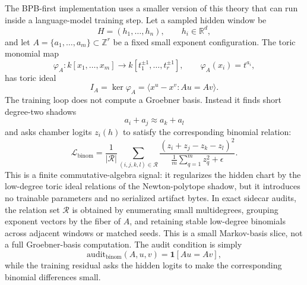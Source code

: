 \documentclass[11pt]{article}
\theoremstyle{definition}
\theoremstyle{plain}
\theoremstyle{remark}
\numberwithin{equation}{section}
\newcommand{\R}{\mathbb{R}}
\newcommand{\Z}{\mathbb{Z}}
\begin{document}
The BPB-first implementation uses a smaller version of this theory that can run inside a language-model training step.  Let a sampled hidden window be
\begin{equation}
  H=(h_1,\ldots,h_n),\qquad h_i\in\R^d,
\end{equation}
and let $A=\{a_1,\ldots,a_m\}\subset \Z^r$ be a fixed small exponent configuration.  The toric monomial map
\begin{equation}
  \varphi_A:k[x_1,\ldots,x_m]\to k[t_1^{\pm1},\ldots,t_r^{\pm1}],
  \qquad \varphi_A(x_i)=t^{a_i},
\end{equation}
has toric ideal
\begin{equation}
  I_A=\ker\varphi_A=\langle x^u-x^v:Au=Av\rangle.
\end{equation}
The training loop does not compute a Groebner basis.  Instead it finds short degree-two shadows
\begin{equation}
  a_i+a_j\approx a_k+a_l
\end{equation}
and asks chamber logits $z_i(h)$ to satisfy the corresponding binomial relation:
\begin{equation}
  \mathcal L_{\mathrm{binom}}
  =
  \frac{1}{|\mathcal R|}
  \sum_{(i,j,k,l)\in\mathcal R}
  \frac{(z_i+z_j-z_k-z_l)^2}
       {\frac1m\sum_{q=1}^m z_q^2+\epsilon}.
\end{equation}
This is a finite commutative-algebra signal: it regularizes the hidden chart by the low-degree toric ideal relations of the Newton-polytope shadow, but it introduces no trainable parameters and no serialized artifact bytes.
In exact sidecar audits, the relation set $\mathcal R$ is obtained by enumerating small multidegrees, grouping exponent vectors by the fiber of $A$, and retaining stable low-degree binomials across adjacent windows or matched seeds.  This is a small Markov-basis slice, not a full Groebner-basis computation.  The audit condition is simply
\begin{equation}
  \mathrm{audit}_{\mathrm{binom}}(A,u,v)=\mathbf 1[Au=Av],
\end{equation}
while the training residual asks the hidden logits to make the corresponding binomial differences small.
\end{document}
